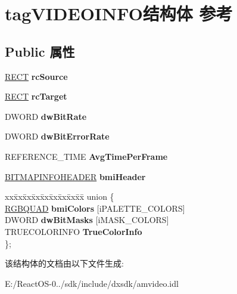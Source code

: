 \hypertarget{structtag_v_i_d_e_o_i_n_f_o}{}\section{tag\+V\+I\+D\+E\+O\+I\+N\+F\+O结构体 参考}
\label{structtag_v_i_d_e_o_i_n_f_o}
\subsection*{Public 属性}
\begin{DoxyCompactItemize}
\item 
\mbox{\label{structtag_v_i_d_e_o_i_n_f_o_ab07fa444f4c7996ff7037ce8aadd9eba}} 
\hyperlink{structtag_r_e_c_t}{R\+E\+CT} {\bfseries rc\+Source}
\item 
\mbox{\label{structtag_v_i_d_e_o_i_n_f_o_ae250356583d33ca8a4a2b56cfb1b3899}} 
\hyperlink{structtag_r_e_c_t}{R\+E\+CT} {\bfseries rc\+Target}
\item 
\mbox{\label{structtag_v_i_d_e_o_i_n_f_o_a69afd2aecc8f0643546cc868eeed01eb}} 
D\+W\+O\+RD {\bfseries dw\+Bit\+Rate}
\item 
\mbox{\label{structtag_v_i_d_e_o_i_n_f_o_a93b0961e66978c49f9c96eb7078f30a7}} 
D\+W\+O\+RD {\bfseries dw\+Bit\+Error\+Rate}
\item 
\mbox{\label{structtag_v_i_d_e_o_i_n_f_o_af1518321e580d25eb1e8e433a7a024e0}} 
R\+E\+F\+E\+R\+E\+N\+C\+E\+\_\+\+T\+I\+ME {\bfseries Avg\+Time\+Per\+Frame}
\item 
\mbox{\label{structtag_v_i_d_e_o_i_n_f_o_aba002f6aa3fee2de0692d271c05ba142}} 
\hyperlink{struct_b_i_t_m_a_p_i_n_f_o_h_e_a_d_e_r}{B\+I\+T\+M\+A\+P\+I\+N\+F\+O\+H\+E\+A\+D\+ER} {\bfseries bmi\+Header}
\item 
\mbox{\label{structtag_v_i_d_e_o_i_n_f_o_a3eed6232ecdcd3e9bb8c0e328c1d4eb1}} 
\begin{tabbing}
xx\=xx\=xx\=xx\=xx\=xx\=xx\=xx\=xx\=\kill
union \{\\
\>\hyperlink{structtag_r_g_b_q_u_a_d}{RGBQUAD} {\bfseries bmiColors} \mbox{[}iPALETTE\_COLORS\mbox{]}\\
\>DWORD {\bfseries dwBitMasks} \mbox{[}iMASK\_COLORS\mbox{]}\\
\>TRUECOLORINFO {\bfseries TrueColorInfo}\\
\}; \\

\end{tabbing}\end{DoxyCompactItemize}


该结构体的文档由以下文件生成\+:\begin{DoxyCompactItemize}
\item 
E\+:/\+React\+O\+S-\/0../sdk/include/dxsdk/amvideo.\+idl\end{DoxyCompactItemize}
